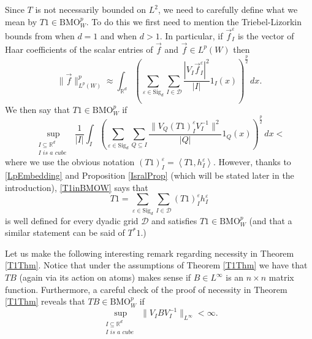 \documentclass[12pt,reqno ]{amsart}
\numberwithin{equation}{section}
\theoremstyle{definition}
\newcommand{\Rd}{\ensuremath{\mathbb{R}^d}}
\newcommand{\D}{\ensuremath{\mathscr{D}}}
\newcommand{\BMOW}{\ensuremath{{\text{BMO}}_W ^p}}
\newcommand{\V}[1]{\ensuremath{\vec{#1}}}
\newcommand{\inrd}{\ensuremath{\int_{\Rd}}}
\newcommand{\ip}[2]{\ensuremath{\left\langle#1,#2\right\rangle}}
\renewcommand{\S}{\ensuremath{\text{Sig}_d}}
\begin{document}
 Since $T$ is not necessarily bounded on $L^2$, we need to carefully define what we mean by $T1 \in \BMOW$.  To do this we first need to mention the Triebel-Lizorkin bounds from \cite{NT, V} when $d = 1$ and \cite{I} when $d > 1$.  In particular,   if $\V{f}_I ^\varepsilon$ is the vector of Haar coefficients of the scalar entries of $\V{f}$ and $\V{f} \in L^p(W)$ then     \begin{equation}   \|\vec{f}\|_{L^p(W)} ^p  \approx \inrd \left(\sum_{\varepsilon \in \S} \sum_{I \in \D} \frac{| V_I \vec{f}_I ^\varepsilon |^2}{|I|} 1_I(x) \right)^\frac{p}{2} \, dx.  \label{LpEmbedding}  \end{equation}  We then say that $T1 \in \BMOW$ if  \begin{equation} \label{T1inBMOW} \sup_{\substack{I \subseteq \Rd \\ I \textit{ is a cube }}}  \, \frac{1}{|I|} \int_I \left(\sum_{\varepsilon \in \S} \sum_{Q \subseteq I}  \frac{\|V_Q (T1)_I ^\varepsilon V_I^{-1} \|^2}{|Q|} 1_Q (x) \right)^\frac{p}{2} \, dx < \end{equation} where we use the obvious notation $(T1)_I ^\varepsilon = \ip{T1}{h_I ^\varepsilon}$.  However, thanks to \eqref{LpEmbedding} and Proposition \ref{IsralProp} (which will be stated later in the introduction), \eqref{T1inBMOW} says that
 \begin{equation*} T1 = \sum_{\varepsilon \in \S} \sum_{I \in \D} (T1)_I ^\varepsilon  h_I ^\varepsilon \end{equation*} is well defined for every dyadic grid $\D$ and satisfies $T1 \in \BMOW$ (and that a similar statement can be said of $T^* 1$.)

 Let us make the following interesting remark regarding necessity in Theorem \ref{T1Thm}.  Notice that under the assumptions of Theorem \ref{T1Thm} we have that $TB$ (again via its action on atoms) makes sense if $B \in L^\infty$ is an $n \times n$ matrix function.  Furthermore, a careful check of the proof of necessity in Theorem \ref{T1Thm} reveals that $TB \in \BMOW$ if \begin{equation*} \sup_{\substack{I \subseteq \Rd \\ I \textit{ is a cube }}} \|V_I B V_I ^{-1}\|_{L^\infty} < \infty. \end{equation*}
\end{document}
